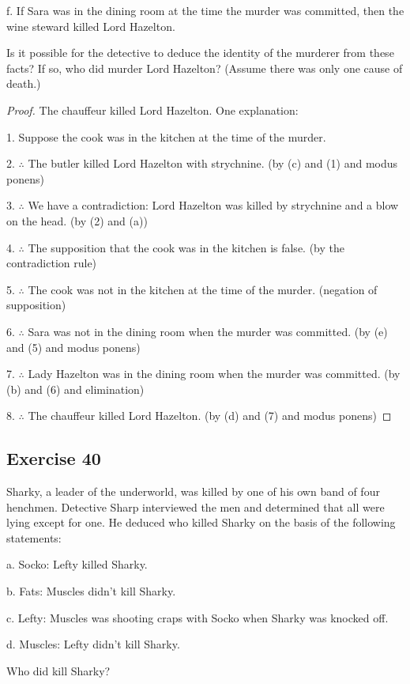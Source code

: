 \documentclass[14pt]{extarticle}
\begin{document}
f. If Sara was in the dining room at the time the murder was committed, then the wine steward killed Lord Hazelton.

Is it possible for the detective to deduce the identity of the murderer from these facts? If so, who did murder Lord Hazelton? (Assume there was only one cause of death.)

\begin{proof}
    The chauffeur killed Lord Hazelton. One explanation:

    1. Suppose the cook was in the kitchen at the time of the murder.

    2. $\therefore$ The butler killed Lord Hazelton with strychnine. (by (c) and (1) and modus ponens)

    3. $\therefore$ We have a contradiction: Lord Hazelton was killed by strychnine and a blow on the head. (by (2) and (a))

    4. $\therefore$ The supposition that the cook was in the kitchen is false. (by the contradiction rule)

    5. $\therefore$ The cook was not in the kitchen at the time of the murder. (negation of supposition)

    6. $\therefore$ Sara was not in the dining room when the murder was committed. (by (e) and (5) and modus ponens)

    7. $\therefore$ Lady Hazelton was in the dining room when the murder was committed. (by (b) and (6) and elimination)

    8. $\therefore$ The chauffeur killed Lord Hazelton. (by (d) and (7) and modus ponens)
\end{proof}

\subsection{Exercise 40}
Sharky, a leader of the underworld, was killed by one of his own band of four henchmen. Detective Sharp interviewed the men and determined that all were lying except for one. He deduced who killed Sharky on the basis of the following statements:

a. Socko: Lefty killed Sharky.

b. Fats: Muscles didn’t kill Sharky.

c. Lefty: Muscles was shooting craps with Socko when Sharky was knocked off.

d. Muscles: Lefty didn’t kill Sharky.

Who did kill Sharky?
\end{document}
